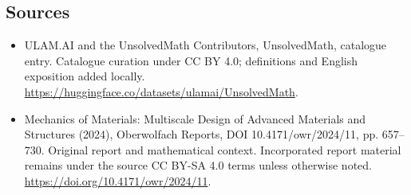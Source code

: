 \documentclass[11pt]{article}
\begin{document}
\subsection{Sources}
\begin{itemize}
\item[\hypertarget{source:statement:1}{S1}] ULAM.AI and the UnsolvedMath Contributors, UnsolvedMath, catalogue entry. Catalogue curation under CC BY 4.0; definitions and English exposition added locally.
\url{https://huggingface.co/datasets/ulamai/UnsolvedMath}.
\item[\hypertarget{source:statement:2}{S2}] Mechanics of Materials: Multiscale Design of Advanced Materials and Structures (2024), Oberwolfach Reports, DOI 10.4171/owr/2024/11, pp. 657--730. Original report and mathematical context. Incorporated report material remains under the source CC BY-SA 4.0 terms unless otherwise noted.
\url{https://doi.org/10.4171/owr/2024/11}.
\end{itemize}
\label{end:statement}
\end{document}
